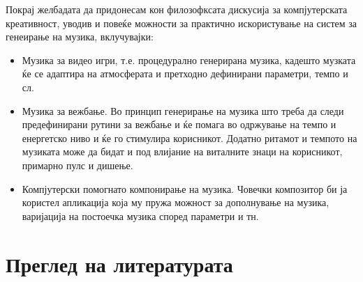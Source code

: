 Покрај желбадата да придонесам кон филозофксата дискусија за компјутерската креативност, уводив и повеќе можности за практично искористување на систем за генеирање на музика, вклучувајки:
\begin{itemize}
\item Музика за видео игри, т.е. процедурално генерирана музика, кадешто музката ќе се адаптира на атмосферата и претходно дефинирани параметри, темпо и сл.
\item Музика за вежбање. Во принцип генерирање на музика што треба да следи предефинирани рутини за вежбање и ќе помага во одржување на темпо и енергетско ниво и ќе го стимулира корисникот. Додатно ритамот и темпото на музиката може да бидат и под влијание на виталните знаци на корисникот, примарно пулс и дишење.
\item Компјутерски помогнато компонирање на музика. Човечки композитор би ја користел апликација која му пружа можност за дополнување на музика, варијација на постоечка музика според параметри и тн.
\end{itemize}

\chapter{Преглед на литературата}
\label{ch:pregled}

